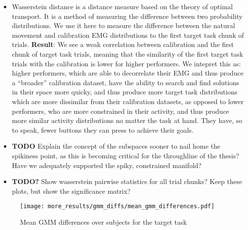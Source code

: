 \documentclass[../main.tex]{subfiles}
\begin{document}
\begin{itemize}
  \item Wasserstein distance is a distance measure based on the theory of optimal transport. It is a method of measuring the difference between two probability distributions. We use it here to measure the difference between the natural movement and calibration EMG distributions to the first target task chunk of trials. \textbf{Result}: We see a weak correlation between calibration and the first chunk of target task trials, meaning that the similarity of the first target task trials with the calibration is lower for higher performers. We intepret this as: higher performers, which are able to decorrelate their EMG and thus produce a ``broader'' calibration dataset, have the ability to search and find solutions in their space more quicky, and thus produce more target task distributions which are more dissimilar from their calibration datasets, as opposed to lower performers, who are more constrained in their activity, and thus produce more similar activity distributions no matter the task at hand. They have, so to speak, fewer buttons they can press to achieve their goals.
  \item \textbf{TODO} Explain the concept of the subspaces sooner to nail home the spikiness point, as this is becoming critical for the throughline of the thesis? Have we adequately supported the spiky, constrained manifold?
  \item \textbf{TODO?} Show wasserstein pairwise statistics for all trial chunks? Keep these plots, but show the significance matrix?
\end{itemize}


\begin{figure}[H]%
  \centering
    \texttt{[image: more\_results/gmm\_diffs/mean\_gmm\_differences.pdf]}
    \caption[Mean GMM Frobenius differences over subjects]{Mean GMM differences over subjects for the target task}\label{fig:gmm_Fr_diffs}
\end{figure}
\end{document}
